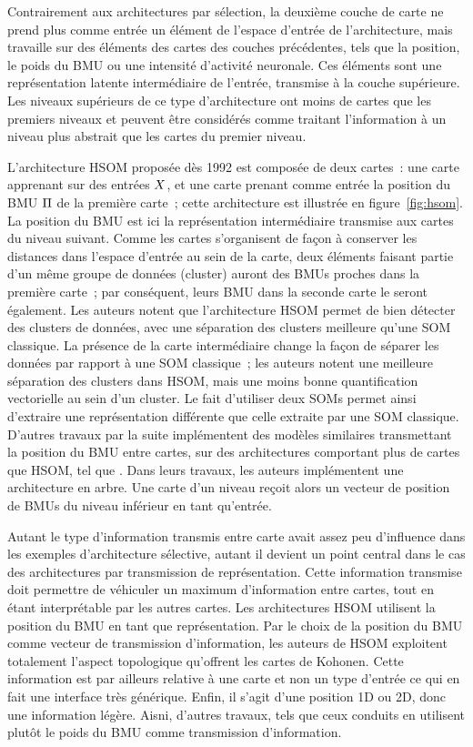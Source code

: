 \documentclass[../main]{subfiles}
\begin{document}
Contrairement aux architectures par sélection, la deuxième couche de carte ne prend plus comme entrée un élément de l'espace d'entrée de l'architecture, mais travaille sur des éléments des cartes des couches précédentes, tels que la position, le poids du BMU ou une intensité d'activité neuronale. 
Ces éléments sont une représentation latente intermédiaire de l'entrée, transmise à la couche supérieure. Les niveaux supérieurs de ce type d'architecture ont moins de cartes que les premiers niveaux et peuvent être considérés comme traitant l'information à un niveau plus abstrait que les cartes du premier niveau.


L'architecture  HSOM \cite{lampinen_clustering_1992} proposée dès 1992 est composée de deux cartes~: une carte apprenant sur des entrées $X$, et une carte prenant comme entrée la position du BMU $\Pi$ de la première carte~; cette architecture est illustrée en figure~\ref{fig:hsom}. 
La position du BMU est ici la représentation intermédiaire transmise aux cartes du niveau suivant.
Comme les cartes s'organisent de façon à conserver les distances dans l'espace d'entrée au sein de la carte, deux éléments faisant partie d'un même groupe de données (cluster) auront des BMUs proches dans la première carte~; par conséquent, leurs BMU dans la seconde carte le seront également. 
Les auteurs notent que l'architecture HSOM permet de bien détecter des clusters de données, avec une séparation des clusters meilleure qu'une SOM classique.
La présence de la carte intermédiaire change la façon de séparer les données par rapport à une SOM classique~; les auteurs notent une meilleure séparation des clusters dans HSOM, mais une moins bonne quantification vectorielle au sein d'un cluster. Le fait d'utiliser deux SOMs permet ainsi d'extraire une représentation différente que celle extraite par une SOM classique.
D'autres travaux par la suite implémentent des modèles similaires transmettant la position du BMU entre cartes, sur des architectures comportant plus de cartes que HSOM, tel que \cite{hagenauer_hierarchical_2013}. Dans leurs travaux, les auteurs implémentent une architecture en arbre. Une carte d'un niveau reçoit alors un vecteur de position de BMUs du niveau inférieur en tant qu'entrée.

Autant le type d'information transmis entre carte avait assez peu d'influence dans les exemples d'architecture sélective, autant il devient un point central dans le cas des architectures par transmission de représentation. Cette information transmise doit permettre de véhiculer un maximum d'information entre cartes, tout en étant interprétable par les autres cartes. Les architectures HSOM utilisent la position du BMU en tant que représentation. Par le choix de la position du BMU comme vecteur de transmission d'information, les auteurs de HSOM exploitent totalement l'aspect topologique qu'offrent les cartes de Kohonen. Cette information est par ailleurs relative à une carte et non un type d'entrée ce qui en fait une interface très générique. Enfin, il s'agit d'une position 1D ou 2D, donc une information légère.
Aisni, d'autres travaux, tels que ceux conduits en \cite{wang_comparisonal_2007, gunes_kayacik_hierarchical_2007} utilisent plutôt le poids du BMU comme transmission d'information.
\end{document}
